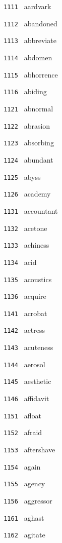 \documentclass[11pt]{article}
\begin{document}
\begin{multicols}{6}
\small
\noindent \texttt{ 1111 } aardvark  \par
\noindent \texttt{ 1112 } abandoned  \par
\noindent \texttt{ 1113 } abbreviate  \par
\noindent \texttt{ 1114 } abdomen  \par
\noindent \texttt{ 1115 } abhorrence  \par
\noindent \texttt{ 1116 } abiding  \par
\noindent \texttt{ 1121 } abnormal  \par
\noindent \texttt{ 1122 } abrasion  \par
\noindent \texttt{ 1123 } absorbing  \par
\noindent \texttt{ 1124 } abundant  \par
\noindent \texttt{ 1125 } abyss  \par
\noindent \texttt{ 1126 } academy  \par
\noindent \texttt{ 1131 } accountant  \par
\noindent \texttt{ 1132 } acetone  \par
\noindent \texttt{ 1133 } achiness  \par
\noindent \texttt{ 1134 } acid  \par
\noindent \texttt{ 1135 } acoustics  \par
\noindent \texttt{ 1136 } acquire  \par
\noindent \texttt{ 1141 } acrobat  \par
\noindent \texttt{ 1142 } actress  \par
\noindent \texttt{ 1143 } acuteness  \par
\noindent \texttt{ 1144 } aerosol  \par
\noindent \texttt{ 1145 } aesthetic  \par
\noindent \texttt{ 1146 } affidavit  \par
\noindent \texttt{ 1151 } afloat  \par
\noindent \texttt{ 1152 } afraid  \par
\noindent \texttt{ 1153 } aftershave  \par
\noindent \texttt{ 1154 } again  \par
\noindent \texttt{ 1155 } agency  \par
\noindent \texttt{ 1156 } aggressor  \par
\noindent \texttt{ 1161 } aghast  \par
\noindent \texttt{ 1162 } agitate  \par

\end{multicols}
\end{document}
